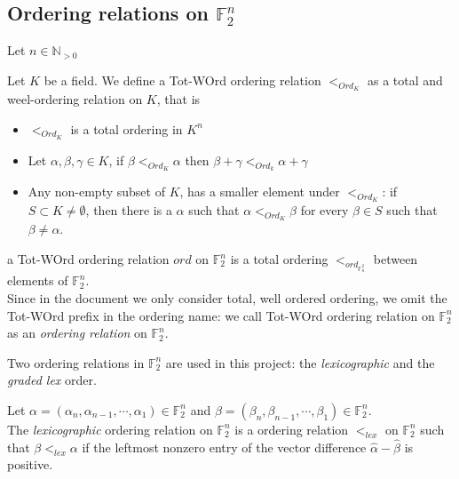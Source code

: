 \documentclass[11pt]{llncs}
\begin{document}
\subsection{Ordering relations on \texorpdfstring{$\mathbb{F}_2^n$}{F\_2^n}}
Let $n\in \mathbb{N}_{>0}$
\begin{definition}\label{def:orderingOnK}
	Let $K$ be a field. We define a Tot-WOrd ordering relation $<_{Ord_K}$ as a total and weel-ordering relation on $K$, that is
	\begin{itemize}
		\item $<_{Ord_K}$ is a total ordering in $K^{n}$
		\item Let $\alpha, \beta, \gamma \in K$, if $\beta <_{Ord_K} \alpha$ then $\beta + \gamma <_{Ord_k} \alpha + \gamma$
		\item Any non-empty subset of $K$, has a smaller element under $<_{Ord_K}$: if $S \subset K \neq \emptyset$, then there is a $\alpha$ such that $\alpha <_{Ord_K} \beta$ for every $\beta \in S$ such that $\beta \neq \alpha$. 
	\end{itemize}
\end{definition}

\begin{definition}\label{def:OrderingOnF2n}
	a Tot-WOrd ordering relation $ord$ on $\mathbb{F}_2^n$ is a total ordering $<_{ord_{\mathbb{F}_n^2}}$ between elements of $\mathbb{F}_2^n$.\\
	Since in the document we only consider total, well ordered ordering, we omit the Tot-WOrd prefix in the ordering name: we call Tot-WOrd ordering relation on $\mathbb{F}_2^n$ as an \textit{ordering relation} on $\mathbb{F}_2^n$. 
\end{definition}

Two ordering relations in $\mathbb{F}_2^n$ are used in this project: the \textit{lexicographic} and the \textit{graded lex} order.

\begin{definition}
	Let $\alpha = (\alpha_n, \alpha_{n-1}, \cdots, \alpha_1) \in \mathbb{F}_2^n$ and $\beta = (\beta_n, \beta_{n-1}, \cdots, \beta_1) \in \mathbb{F}_2^n$.\\
	The \textit{lexicographic} ordering relation on $\mathbb{F}_2^n$ is a ordering relation $<_{lex}$ on $\mathbb{F}_2^n$ such that $\beta <_{lex} \alpha$ if the leftmost nonzero entry of the vector difference $\hat{\alpha}-\hat{\beta}$ is positive.
\end{definition}
\end{document}
